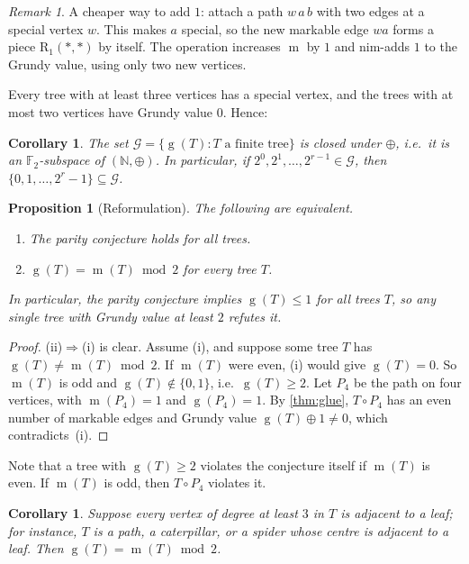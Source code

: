 \documentclass[11pt]{amsart}
\newtheorem{proposition}[theorem]{Proposition}
\newtheorem{corollary}[theorem]{Corollary}
\theoremstyle{definition}
\theoremstyle{remark}
\newtheorem{remark}[theorem]{Remark}
\newcommand{\G}{\mathcal{G}}
\newcommand{\gv}{\operatorname{g}}           %
\newcommand{\m}{\operatorname{m}}
\newcommand{\R}{\mathrm{R}}
\newcommand{\free}{\ast}
\newcommand{\NN}{\mathbb{N}}
\begin{document}
\begin{remark}\label{rem:plusone}
A cheaper way to add $1$: attach a path $w\,a\,b$ with two edges at a special vertex $w$. This makes $a$ special, so the new markable edge $wa$ forms a piece $\R_1(\free,\free)$ by itself. The operation increases $\m$ by $1$ and nim-adds $1$ to the Grundy value, using only two new vertices.
\end{remark}

Every tree with at least three vertices has a special vertex, and the trees with at most two vertices have Grundy value $0$. Hence:

\begin{corollary}\label{cor:subgroup}
The set $\G=\{\gv(T): T\text{ a finite tree}\}$ is closed under $\oplus$, i.e.\ it is an $\mathbb{F}_2$-subspace of $(\NN,\oplus)$. In particular, if $2^0,2^1,\dots,2^{r-1}\in\G$, then $\{0,1,\dots,2^r-1\}\subseteq\G$.
\end{corollary}

\begin{proposition}[Reformulation]\label{prop:reform}
The following are equivalent.
\begin{enumerate}[label=\textup{(\roman*)}]
\item The parity conjecture holds for all trees.
\item $\gv(T)=\m(T)\bmod 2$ for every tree $T$.
\end{enumerate}
In particular, the parity conjecture implies $\gv(T)\le1$ for all trees $T$, so any single tree with Grundy value at least $2$ refutes it.
\end{proposition}

\begin{proof}
(ii)$\Rightarrow$(i) is clear. Assume (i), and suppose some tree $T$ has $\gv(T)\ne \m(T)\bmod2$. If $\m(T)$ were even, (i) would give $\gv(T)=0$. So $\m(T)$ is odd and $\gv(T)\notin\{0,1\}$, i.e.\ $\gv(T)\ge2$. Let $P_4$ be the path on four vertices, with $\m(P_4)=1$ and $\gv(P_4)=1$. By \cref{thm:glue}, $T\circ P_4$ has an even number of markable edges and Grundy value $\gv(T)\oplus1\ne0$, which contradicts~(i).
\end{proof}

Note that a tree with $\gv(T)\ge2$ violates the conjecture itself if $\m(T)$ is even. If $\m(T)$ is odd, then $T\circ P_4$ violates it.

\begin{corollary}\label{cor:leafbranch}
Suppose every vertex of degree at least $3$ in $T$ is adjacent to a leaf; for instance, $T$ is a path, a caterpillar, or a spider whose centre is adjacent to a leaf. Then $\gv(T)=\m(T)\bmod 2$.
\end{corollary}
\end{document}
